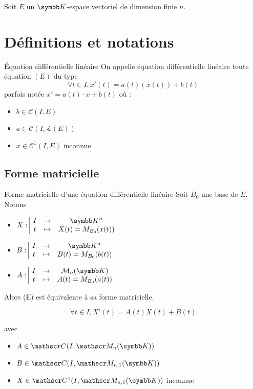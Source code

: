 Soit $E$ un $\K$-espace vectoriel de dimension finie $n$.

\section{Définitions et notations}


\lvspace \begin{definition}{Équation différentielle linéaire}{}
    On appelle équation différentielle linéaire toute équation $(E)$ du type 
    $$\forall t \in I, x'(t) = a(t)(x(t)) + b(t)$$ parfois notée 
    $x' = a(t) \cdot x + b(t)$ où : 
    \begin{itemize}
        \item $b \in \mathscr C(I, E)$
        \item $a \in \mathscr C(I, \mathscr L(E))$
        \item $x \in \mathscr C^1(I, E)$ inconnue
    \end{itemize}
\end{definition}

\subsection{Forme matricielle}

\begin{proposition}{Forme matricielle d'une équation différentielle linéaire}{}
    Soit $B_0$ une base de $E$. Notons 
    
    \begin{itemize}
        \item $\fonction{X}{I}{\K^n}{t}{X(t) = M_{B_0}(x(t))}$
        \item \avspace $\fonction{B}{I}{\K^n}{t}{B(t) = M_{B_0}(b(t))}$ 
        \item \avspace $\fonction{A}{I}{\mathcal M_n(\K)}{t}{A(t) = M_{B_0}(a(t))}$
    \end{itemize}

    Alors (E) est équivalente à sa forme matricielle. 

    $$\forall t \in I, X'(t) = A(t)X(t) + B(t)$$

    avec 
    \begin{itemize}
        \item $A \in \mathscr C(I, \mathscr M_n(\K))$
        \item $B \in \mathscr C(I, \mathscr M_{n,1}(\K))$
        \item $X \in \mathscr C^1(I, \mathscr M_{n,1}(\K))$ inconnue
    \end{itemize}
\end{proposition}

